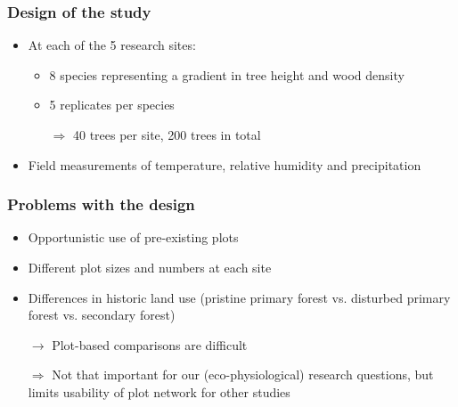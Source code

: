 \documentclass[usepdftitle=false]{beamer}
\newcommand{\rar}{$\rightarrow$}
\newcommand{\Rar}{$\Rightarrow$}
\begin{document}
\begin{frame}
	\frametitle{Design of the study}
\begin{itemize}
	\item At each of the 5 research sites:
	\begin{itemize}
		\item 8 species representing a gradient in tree height and wood density
		\item 5 replicates per species
		\item[\Rar] 40 trees per site, 200 trees in total
	\end{itemize}
	\item Field measurements of temperature, relative humidity and precipitation
\end{itemize}
\end{frame}

\begin{frame}
	\frametitle{Problems with the design}
	\begin{itemize}
		\item Opportunistic use of pre-existing plots
		\item Different plot sizes and numbers at each site
		\item Differences in historic land use (pristine primary forest vs. disturbed primary forest vs. secondary forest)
		\item[\rar] Plot-based comparisons are difficult
		\item[\Rar] Not that important for our (eco-physiological) research questions, but limits usability of plot network for other studies
	\end{itemize}
\end{frame}
\end{document}
